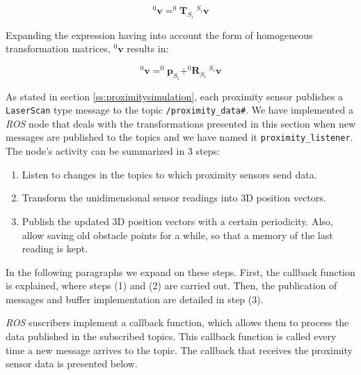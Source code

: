 $$
^{0}\mathbf{v} = ^{0}\mathbf{T}_{S_i} \: ^{S_i}\mathbf{v}
$$

Expanding the expression having into account the form of homogeneous transformation matrices, $^{0}\mathbf{v}$ results in:


\begin{equation}
\label{eq:livepoints}
^{0}\mathbf{v} = ^{0}\mathbf{p}_{S_i} + ^{0}\mathbf{R}_{S_i} \: ^{S_i}\mathbf{v}
\end{equation}

As stated in section \ref{ss:proximitysimulation}, each proximity sensor publishes a \lstinline{LaserScan} type message to the topic \lstinline{/proximity_data#}. We have implemented a \textit{ROS} node that deals with the transformations presented in this section when new messages are published to the topics and we have named it \lstinline{proximity_listener}. The node's activity can be summarized in $3$ steps:

\begin{enumerate}
    \item Listen to changes in the topics to which proximity sensors send data.
    \item Transform the unidimensional sensor readings into 3D position vectors.
    \item Publish the updated 3D position vectors with a certain periodicity. Also, allow saving old obstacle points for a while, so that a memory of the last reading is kept.
\end{enumerate}

In the following paragraphs we expand on these steps. First, the callback function is explained, where steps (1) and (2) are carried out. Then, the publication of messages and buffer implementation are detailed in step (3).

\textit{ROS} suscribers implement a callback function, which allows them to process the data published in the subscribed topics. This callback function is called every time a new message arrives to the topic. The callback that receives the proximity sensor data is presented below.


